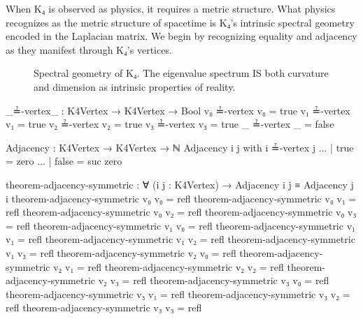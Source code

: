\documentclass[11pt,a4paper]{book}
\begin{document}
When K₄ is observed as physics, it requires a metric structure. What physics recognizes as the metric structure of spacetime is K₄'s intrinsic spectral geometry encoded in the Laplacian matrix. We begin by recognizing equality and adjacency as they manifest through K₄'s vertices.

\begin{figure}[h]
\centering
{}
\caption{Spectral geometry of K₄. The eigenvalue spectrum IS both curvature and dimension as intrinsic properties of reality.}
\label{fig:spectral-geometry}
\end{figure}

\begin{code}
_≟-vertex_ : K4Vertex → K4Vertex → Bool
v₀ ≟-vertex v₀ = true
v₁ ≟-vertex v₁ = true
v₂ ≟-vertex v₂ = true
v₃ ≟-vertex v₃ = true
_  ≟-vertex _  = false

Adjacency : K4Vertex → K4Vertex → ℕ
Adjacency i j with i ≟-vertex j
... | true  = zero
... | false = suc zero

theorem-adjacency-symmetric : ∀ (i j : K4Vertex) → Adjacency i j ≡ Adjacency j i
theorem-adjacency-symmetric v₀ v₀ = refl
theorem-adjacency-symmetric v₀ v₁ = refl
theorem-adjacency-symmetric v₀ v₂ = refl
theorem-adjacency-symmetric v₀ v₃ = refl
theorem-adjacency-symmetric v₁ v₀ = refl
theorem-adjacency-symmetric v₁ v₁ = refl
theorem-adjacency-symmetric v₁ v₂ = refl
theorem-adjacency-symmetric v₁ v₃ = refl
theorem-adjacency-symmetric v₂ v₀ = refl
theorem-adjacency-symmetric v₂ v₁ = refl
theorem-adjacency-symmetric v₂ v₂ = refl
theorem-adjacency-symmetric v₂ v₃ = refl
theorem-adjacency-symmetric v₃ v₀ = refl
theorem-adjacency-symmetric v₃ v₁ = refl
theorem-adjacency-symmetric v₃ v₂ = refl
theorem-adjacency-symmetric v₃ v₃ = refl
\end{code}
\end{document}
